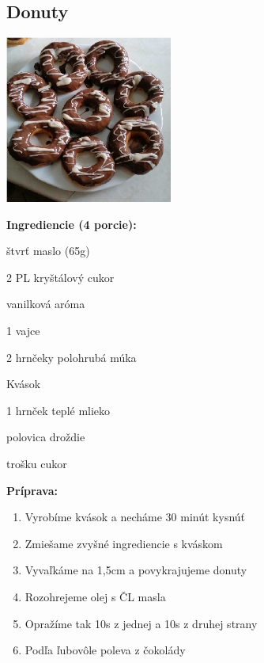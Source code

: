 \setcounter{step}{0}

\subsection{ Donuty }

\begin{ingredient}
  
      \includegraphics[height=5.5cm]{images/donuty}
  
  \def\portions{  }
  \textbf{ {\normalsize Ingrediencie (4 porcie):} }

  \begin{main}
      \item štvrť maslo (65g)
      \item 2 PL kryštálový cukor
      \item vanilková aróma
      \item 1 vajce
      \item 2 hrnčeky polohrubá múka
  \end{main}
  
    \begin{subingredient}{Kvások}
        \item 1 hrnček teplé mlieko
        \item polovica droždie
        \item trošku cukor
    \end{subingredient}
  
\end{ingredient}
\begin{recipe}
\textbf{ {\normalsize Príprava:} }
\begin{enumerate}

  \item{Vyrobíme kvások a necháme 30 minút kysnúť}
  \item{Zmiešame zvyšné ingrediencie s kváskom}
  \item{Vyvaľkáme na 1,5cm a povykrajujeme donuty}
  \item{Rozohrejeme olej s ČL masla}
  \item{Opražíme tak 10s z jednej a 10s z druhej strany}
  \item{Podľa ľubovôle poleva z čokolády}

\end{enumerate}
\end{recipe}

\begin{notes}
  
\end{notes}	
\clearpage
